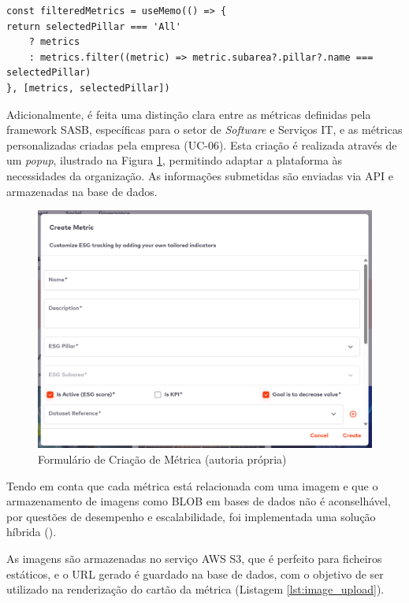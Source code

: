 \begin{lstlisting}[style=customts, caption={Excerto de Código com Filtragem das Métricas}, label={lst:metric_filter}]
const filteredMetrics = useMemo(() => {
return selectedPillar === 'All'
    ? metrics
    : metrics.filter((metric) => metric.subarea?.pillar?.name === selectedPillar)
}, [metrics, selectedPillar])
\end{lstlisting}

Adicionalmente, é feita uma distinção clara entre as métricas definidas pela framework \gls{SASB}, específicas para o setor de \textit{Software} e Serviços IT, e as métricas personalizadas criadas pela empresa (UC-06). Esta criação é realizada através de um \textit{popup}, ilustrado na Figura \ref{fig:metric_creation}, permitindo adaptar a plataforma às necessidades da organização. As informações submetidas são enviadas via API e armazenadas na base de dados.

\begin{figure}[H]
    \centering
    \includegraphics[width=4.5in,keepaspectratio]{frontmatter/assets/platform_prints/metrics/metric_creation.png}
    \caption{Formulário de Criação de Métrica (autoria própria)}
    \label{fig:metric_creation}
\end{figure}

Tendo em conta que cada métrica está relacionada com uma imagem e que o armazenamento de imagens como BLOB em bases de dados não é aconselhável, por questões de desempenho e escalabilidade, foi implementada uma solução híbrida (\cite{code-examplesnet2025}).

As imagens são armazenadas no serviço AWS S3, que é perfeito para ficheiros estáticos, e o URL gerado é guardado na base de dados, com o objetivo de ser utilizado na renderização do cartão da métrica (Listagem \ref{lst:image_upload}).

